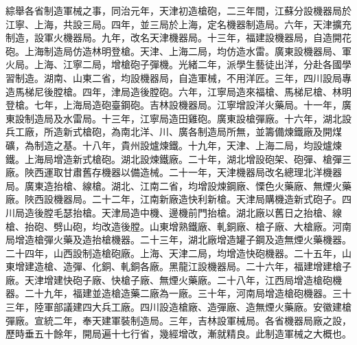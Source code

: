 \begin{pinyinscope}
綜舉各省制造軍械之事，同治元年，天津初造槍砲，二三年間，江蘇分設機器局於江寧、上海，共設三局。四年，並三局於上海，定名機器制造局。六年，天津擴充制造，設軍火機器局。九年，改名天津機器局。十三年，福建設機器局，自造開花砲。上海制造局仿造林明登槍。天津、上海二局，均仿造水雷。廣東設機器局、軍火局。上海、江寧二局，增槍砲子彈機。光緒二年，派學生藝徒出洋，分赴各國學習制造。湖南、山東二省，均設機器局，自造軍械，不用洋匠。三年，四川設局專造馬梯尼後膛槍。四年，津局造後膛砲。六年，江寧局造來福槍、馬梯尼槍、林明登槍。七年，上海局造砲臺鋼砲。吉林設機器局。江寧增設洋火藥局。十一年，廣東設制造局及水雷局。十三年，江寧局造田雞砲。廣東設槍彈廠。十六年，湖北設兵工廠，所造新式槍砲，為南北洋、川、廣各制造局所無，並籌備煉鐵廠及開煤礦，為制造之基。十八年，貴州設爐煉鐵。十九年，天津、上海二局，均設爐煉鐵。上海局增造新式槍砲。湖北設煉鐵廠。二十年，湖北增設砲架、砲彈、槍彈三廠。陜西運取甘肅舊存機器以備造械。二十一年，天津機器局改名總理北洋機器局。廣東造抬槍、線槍。湖北、江南二省，均增設煉鋼廠、慄色火藥廠、無煙火藥廠。陜西設機器局。二十二年，江南新廠造快利新槍。天津局購機造新式砲子。四川局造後膛毛瑟抬槍。天津局造中機、邊機前門抬槍。湖北廠以舊日之抬槍、線槍、抬砲、劈山砲，均改造後膛。山東增熟鐵廠、軋銅廠、槍子廠、大槍廠。河南局增造槍彈火藥及造抬槍機器。二十三年，湖北廠增造罐子鋼及造無煙火藥機器。二十四年，山西設制造槍砲廠。上海、天津二局，均增造快砲機器。二十五年，山東增建造槍、造彈、化銅、軋銅各廠。黑龍江設機器局。二十六年，福建增建槍子廠。天津增建快砲子廠、快槍子廠、無煙火藥廠。二十八年，江西局增造槍砲機器。二十九年，福建並造槍造藥二廠為一廠。三十年，河南局增造槍砲機器。三十三年，陸軍部議建四大兵工廠。四川設造槍廠、造彈廠、造無煙火藥廠。安徽建槍彈廠。宣統二年，奉天建軍裝制造局。三年，吉林設軍械局。各省機器局廠之設，歷時垂五十餘年，開局遍十七行省，幾經增改，漸就精良。此制造軍械之大概也。


\end{pinyinscope}